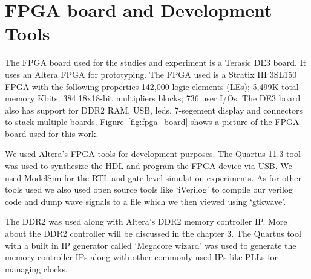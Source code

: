 

\section{FPGA board and Development Tools}
The FPGA board used for the studies and experiment is a Terasic DE3 board. It uses an Altera FPGA for prototyping. The FPGA used is a Stratix III 3SL150 FPGA with the following properties 142,000 logic elements (LEs); 5,499K total memory Kbits; 384 18x18-bit multipliers blocks; 736 user I/Os. The DE3 board also has support for DDR2 RAM, USB, leds, 7-segement display and connectors to stack multiple boards. Figure~\ref{fig:fpga_board} shows a picture of the FPGA board used for this work.

We used Altera's FPGA tools for development purposes. The Quartus 11.3 tool was used to synthesize the HDL and program the FPGA device via USB. We used ModelSim for the RTL and gate level simulation experiments. As for other tools used we also used open source tools like `iVerilog' to compile our verilog code and dump wave signals to a file which we then viewed using `gtkwave'.

The DDR2 was used along with Altera's DDR2 memory controller IP. More about the DDR2 controller will be discussed in the chapter 3. The Quartus tool with a built in IP generator called `Megacore wizard' was used to generate the memory controller IPs along with other commonly used IPs like PLLs for managing clocks.

